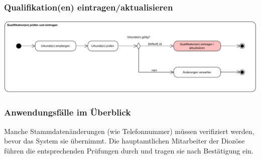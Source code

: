 \documentclass{beamer}
\begin{document}
\begin{frame}
\frametitle{Qualifikation(en) eintragen/aktualisieren}
\includegraphics[width=\textwidth]{PDF/BusinessP/Qualifikation_eintragen.pdf}
\end{frame}

\begin{frame}
\frametitle{Anwendungsfälle im Überblick}
\begin{acronym}
	 {Manche Stammdatenänderungen (wie Telefonnummer) müssen verifiziert werden, bevor das System sie übernimmt. Die hauptamtlichen Mitarbeiter der Diozöse führen die entsprechenden Prüfungen durch und tragen sie nach Bestätigung ein.}
\end{acronym}
\end{frame}

\begin{frame}[title=Hauptgebaeude_Nacht.jpg]
\maketitle
\date{22. Mai 2018}
\end{frame}
\end{document}
